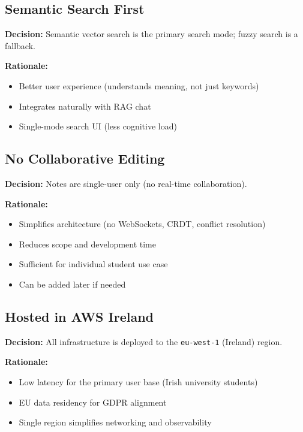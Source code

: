 \documentclass[12pt,a4paper]{article}
\begin{document}
\subsection{Semantic Search First}

\textbf{Decision:} Semantic vector search is the primary search mode; fuzzy search is a fallback.

\textbf{Rationale:}
\begin{itemize}
    \item Better user experience (understands meaning, not just keywords)
    \item Integrates naturally with RAG chat
    \item Single-mode search UI (less cognitive load)
\end{itemize}

\subsection{No Collaborative Editing}

\textbf{Decision:} Notes are single-user only (no real-time collaboration).

\textbf{Rationale:}
\begin{itemize}
    \item Simplifies architecture (no WebSockets, CRDT, conflict resolution)
    \item Reduces scope and development time
    \item Sufficient for individual student use case
    \item Can be added later if needed
\end{itemize}

\subsection{Hosted in AWS Ireland}

\textbf{Decision:} All infrastructure is deployed to the \texttt{eu-west-1} (Ireland) region.

\textbf{Rationale:}
\begin{itemize}
    \item Low latency for the primary user base (Irish university students)
    \item EU data residency for GDPR alignment
    \item Single region simplifies networking and observability
\end{itemize}

\end{document}
